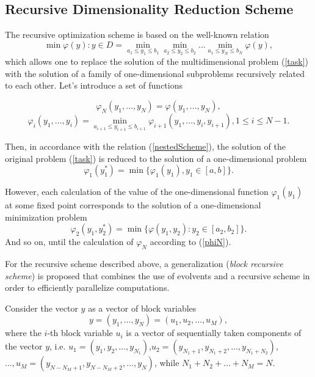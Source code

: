 \documentclass{svproc}
\begin{document}
\subsection{Recursive Dimensionality Reduction Scheme}

The recursive optimization scheme is based on the well-known relation
\begin{equation}
\label{nestedScheme}
\min{\varphi(y):y\in D}=\min_{a_1\leqslant y_1\leqslant b_1}\min_{a_2\leqslant y_2\leqslant b_2}\dots\min_{a_1\leqslant y_N\leqslant b_N}\varphi(y),
\end{equation}
which allows one to replace the solution of the multidimensional problem (\ref{task}) with the solution of a family of one-dimensional subproblems recursively related to each other.
Let's introduce a set of functions

\begin{equation}
\label{phiN}
\varphi_N(y_1,\dots,y_N)=\varphi(y_1,\dots,y_N),
\end{equation}
\begin{equation}
\label{phiI_}
\varphi_i(y_1,\dots,y_i)=\min_{a_{i+1}\leqslant y_{i+1} \leqslant b_{i+1}}\varphi_{i+1}(y_1,\dots,y_i,y_{i+1}),1\leqslant i\leqslant N-1.
\end{equation}

Then, in accordance with the relation (\ref{nestedScheme}), the solution of the original problem (\ref{task}) is reduced to the solution of a one-dimensional problem
\begin{equation}
\label{phiFirst}
\varphi_1(y_1^*)=\min\{\varphi_1(y_1),y_1\in [a,b]\}.
\end{equation}

However, each calculation of the value of the one-dimensional function  \(\varphi_1(y_1)\) at some fixed point corresponds to the solution of a one-dimensional minimization problem 
\begin{displaymath}
\label{phi2}
\varphi_2(y_1,y_2^*)=\min\{\varphi(y_1,y_2):y_2\in [a_2,b_2]\}.
\end{displaymath}
And so on, until the calculation of $\varphi_N$  according to (\ref{phiN}). 

For the recursive scheme described above, a generalization (\textit{block recursive scheme}) is proposed that combines the use of evolvents and a recursive scheme in order to efficiently parallelize computations.

Consider the vector $y$ as a vector of block variables
\begin{displaymath}
y=(y_1,\dots,y_N)=(u_1,u_2,\dots,u_M),
\end{displaymath}
where the \(i\)-th block variable \(u_i\) is a vector of sequentially taken components of the vector \(y\), i.e. $u_1=(y_1,y_2,\dots,y_{N_1})$,$u_2=(y_{N_1+1},y_{N_1+2},\dots,y_{N_1+N_2})$,$\dots,u_M=(y_{N-N_M+1},y_{N-N_M+2},\dots,y_N)$, while \(N_1+N_2+\dots+N_M=N\).
\end{document}
